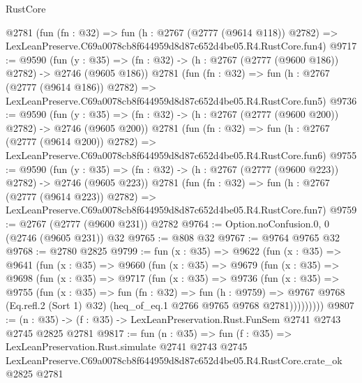 \begin{lexlean}{RustCore}
\begin{coremodule}
    @2781
    (fun (fn : @32) =>
    fun (h : @2767 (@2777 (@9614 @118)) @2782) =>
    LexLeanPreserve.C69a0078cb8f644959d8d87c652d4be05.R4.RustCore.fun4)
@9717 := @9590
    (fun (y : @35) => (fn : @32) -> (h : @2767 (@2777 (@9600 @186)) @2782) -> @2746 (@9605 @186))
    @2781
    (fun (fn : @32) =>
    fun (h : @2767 (@2777 (@9614 @186)) @2782) =>
    LexLeanPreserve.C69a0078cb8f644959d8d87c652d4be05.R4.RustCore.fun5)
@9736 := @9590
    (fun (y : @35) => (fn : @32) -> (h : @2767 (@2777 (@9600 @200)) @2782) -> @2746 (@9605 @200))
    @2781
    (fun (fn : @32) =>
    fun (h : @2767 (@2777 (@9614 @200)) @2782) =>
    LexLeanPreserve.C69a0078cb8f644959d8d87c652d4be05.R4.RustCore.fun6)
@9755 := @9590
    (fun (y : @35) => (fn : @32) -> (h : @2767 (@2777 (@9600 @223)) @2782) -> @2746 (@9605 @223))
    @2781
    (fun (fn : @32) =>
    fun (h : @2767 (@2777 (@9614 @223)) @2782) =>
    LexLeanPreserve.C69a0078cb8f644959d8d87c652d4be05.R4.RustCore.fun7)
@9759 := @2767 (@2777 (@9600 @231)) @2782
@9764 := Option.noConfusion.{0, 0} (@2746 (@9605 @231)) @32
@9765 := @808 @32
@9767 := @9764 @9765 @32
@9768 := @2780 @2825
@9799 := fun (x : @35) =>
  @9622
    (fun (x : @35) =>
    @9641
      (fun (x : @35) =>
      @9660
        (fun (x : @35) =>
        @9679
          (fun (x : @35) =>
          @9698
            (fun (x : @35) =>
            @9717
              (fun (x : @35) =>
              @9736
                (fun (x : @35) =>
                @9755
                  (fun (x : @35) =>
                  fun (fn : @32) =>
                  fun (h : @9759) =>
                  @9767
                    @9768
                    (Eq.refl.{2} (Sort 1) @32)
                    (heq_of_eq.{1} @2766 @9765 @9768 @2781)))))))))
@9807 := (n : @35) -> (f : @35) -> LexLeanPreservation.Rust.FunSem @2741 @2743 @2745 @2825 @2781
@9817 := fun (n : @35) =>
  fun (f : @35) =>
  LexLeanPreservation.Rust.simulate
    @2741
    @2743
    @2745
    LexLeanPreserve.C69a0078cb8f644959d8d87c652d4be05.R4.RustCore.crate_ok
    @2825
    @2781
\end{coremodule}
\end{lexlean}

